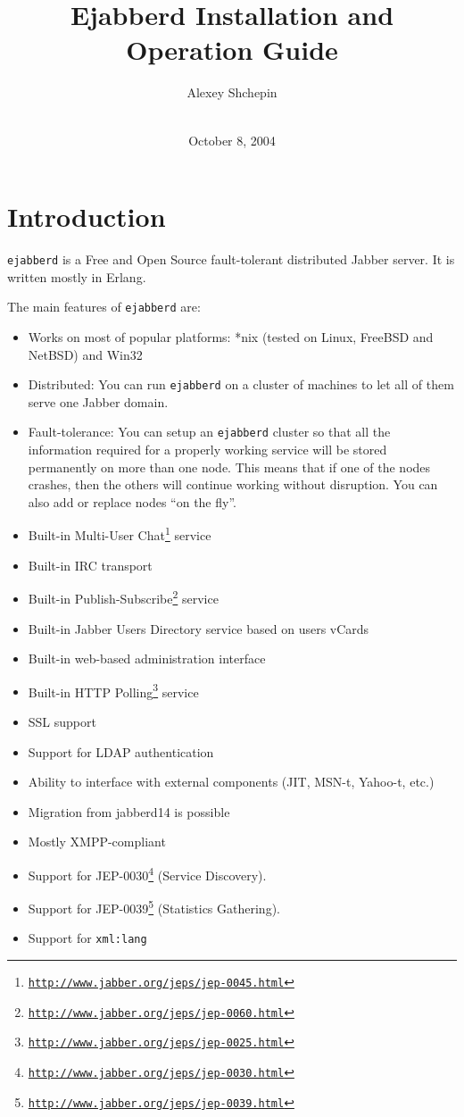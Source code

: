\documentclass[a4paper,10pt]{article}
\title{Ejabberd Installation and Operation Guide}
\author{Alexey Shchepin \\
  \ahrefurl{mailto:alexey@sevcom.net} \\
  \ahrefurl{xmpp:aleksey@jabber.ru}}
\date{October 8, 2004}
\newcommand{\logoscale}{0.7}
\newcommand{\insscaleimg}[2]{
  \imgsrc{#2}{}
  \begin{latexonly}
    \scalebox{#1}{\texttt{[image: \#2]}}
  \end{latexonly}
}
\newcommand{\ns}[1]{\texttt{#1}}
\newcommand{\ejabberd}{\texttt{ejabberd}}
\newcommand{\Jabber}{Jabber}
\gdef\footahref#1#2{#2\footnote{\href{#1}{\texttt{#1}}}}
\newcommand{\tjepref}[2]{\footahref{http://www.jabber.org/jeps/jep-#1.html}{#2}}
\newcommand{\jepref}[1]{\tjepref{#1}{JEP-#1}}
\begin{document}
\begin{titlepage}
  \maketitle{}
  
  {\centering
    \insscaleimg{\logoscale}{logo.png}
    \par
  }
\end{titlepage}
\tableofcontents{}

\newpage
\section{Introduction}
\label{sec:intro}

\ejabberd{} is a Free and Open Source fault-tolerant distributed \Jabber{}
server.  It is written mostly in Erlang.

The main features of \ejabberd{} are:
\begin{itemize}
\item Works on most of popular platforms: *nix (tested on Linux, FreeBSD and
  NetBSD) and Win32
\item Distributed: You can run \ejabberd{} on a cluster of machines to let all of
  them serve one Jabber domain.
\item Fault-tolerance: You can setup an \ejabberd{} cluster so that all the
  information required for a properly working service will be stored
  permanently on more than one node.  This means that if one of the nodes
  crashes, then the others will continue working without disruption.
  You can also add or replace nodes ``on the fly''.
\item Built-in \tjepref{0045}{Multi-User Chat} service
\item Built-in IRC transport
\item Built-in \tjepref{0060}{Publish-Subscribe} service
\item Built-in Jabber Users Directory service based on users vCards
\item Built-in web-based administration interface
\item Built-in \tjepref{0025}{HTTP Polling} service
\item SSL support
\item Support for LDAP authentication
\item Ability to interface with external components (JIT, MSN-t, Yahoo-t, etc.)
\item Migration from jabberd14 is possible
\item Mostly XMPP-compliant
\item Support for \jepref{0030} (Service Discovery).
\item Support for \jepref{0039} (Statistics Gathering).
\item Support for \ns{xml:lang}
\end{itemize}
\end{document}
